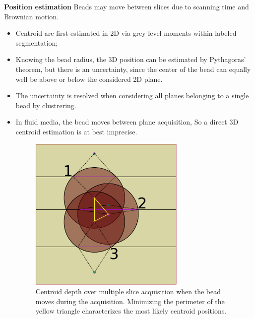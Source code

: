 \documentclass[final,svgnames,dvipsnames,table]{beamer}
\begin{document}
\begin{frame}[fragile]
\begin{columns}[t,totalwidth=\textwidth]
\begin{column}{0.32\textwidth}
    
      \begin{minipage}{1\textwidth}\centering
        \begin{block}{\bf Position estimation}
          Beads may move between
          slices due to scanning time and Brownian motion.
        \begin{itemize}
        \item Centroid are first estimated in 2D via grey-level moments
              within labeled segmentation;
        \item Knowing the bead radius, the 3D position can be estimated by
          Pythagoras' theorem, but there is an uncertainty, since the
          center of the bead can equally well be above or below the
          considered 2D plane.
        \item The uncertainty is resolved when considering all planes
          belonging to a single bead by clustrering.
        \item In fluid media, the bead moves between plane
          acquisition, So a direct 3D centroid estimation is at best imprecise.
          \begin{figure}
            \centering
            \includegraphics[width=0.71\textwidth]{images/multidepth.pdf}
            \caption{Centroid depth over multiple slice acquisition
              when the bead moves during the acquisition. Minimizing the
              perimeter of the yellow triangle characterizes the most
              likely centroid positions.}
            \label{fig:multidepth}
          \end{figure}
          

\end{itemize}
\end{block}
\end{minipage}
\end{column}
\end{columns}
\end{frame}
\end{document}
